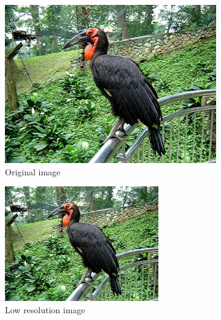 \documentclass[10pt,twocolumn,letterpaper]{article}
\begin{document}
\begin{figure}[h]
\centering
    \begin{subfigure}{0.18\textwidth}
        \includegraphics[width=1\linewidth]{000057.jpg} 
        \caption{Original image}
        \label{fig:subim1}
    \end{subfigure}
    \begin{subfigure}{0.18\textwidth}
        \includegraphics[width=1\linewidth]{000057-lr.jpg}
        \caption{Low resolution image}
        \label{fig:subim2}
    \end{subfigure}
    \begin{subfigure}{0.18\textwidth}

\end{subfigure}
\end{figure}
\end{document}
